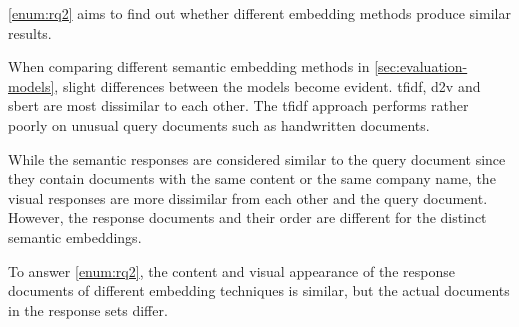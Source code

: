\ref{enum:rq2} aims to find out whether different embedding methods produce similar results.

When comparing different semantic embedding methods in \autoref{sec:evaluation-models}, 
slight differences between the models become evident.
\ac{tfidf}, \ac{d2v} and \ac{sbert} are most dissimilar to each other.
The \ac{tfidf} approach performs rather poorly on unusual query documents such as handwritten documents.

While the semantic responses are considered similar to the query document since
they contain documents with the same content 
or the same company name,
the visual responses are more dissimilar from each other and the query document.
However, the response documents and their order are different for the distinct semantic embeddings.

To answer \ref{enum:rq2}, the content and visual appearance of the response documents 
of different embedding techniques is similar,
but the actual documents in the response sets differ.
